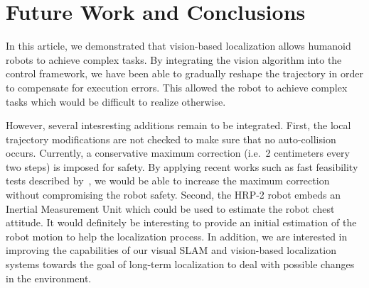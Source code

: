 \section{Future Work and Conclusions}\label{sec:conclusions}
In this article, we demonstrated that vision-based localization allows humanoid robots to achieve complex tasks. By integrating the vision algorithm into the control framework, we have been able to gradually
reshape the trajectory in order to compensate for execution errors. This allowed the robot to achieve complex tasks which would be difficult to realize otherwise.

However, several intesresting additions remain to be integrated. First, the local trajectory modifications are not checked to make sure that no auto-collision occurs. Currently, a conservative maximum correction (i.e.\ 2 centimeters every two steps) is imposed for safety. By applying recent works such as fast feasibility tests described by~\citet{Perrin10icra}, we would be able to increase the maximum correction without compromising the robot safety. Second, the HRP-2 robot embeds an Inertial Measurement Unit
which could be used to estimate the robot chest attitude. It would definitely be interesting to provide an initial estimation of the robot motion to help the localization process. In addition, we are interested in improving the capabilities of our visual SLAM and vision-based localization systems towards the goal of long-term localization to deal with possible changes in the environment.

